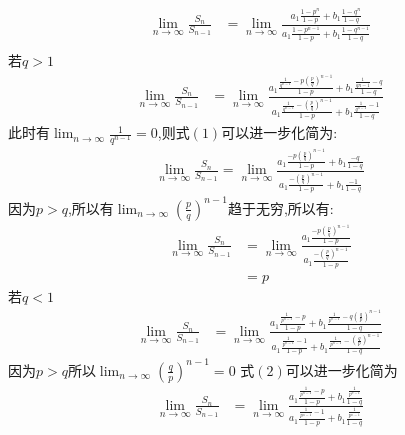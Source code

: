 \begin{questions}
	\begin{solution}
		\begin{align*}
			\lim_{n\to\infty}\frac{S_n}{S_{n-1}}
			 & = \lim_{n\to\infty}\frac{a_1\frac{1-p^n}{1-p}+b_1\frac{1-q^n}{1-q}}{a_1\frac{1-p^{n-1}}{1-p}+b_1\frac{1-q^{n-1}}{1-q}} \\
		\end{align*}
		若$q>1$
		\begin{align*}
			\lim_{n\to\infty}\frac{S_n}{S_{n-1}}
			 & =\lim_{n\to\infty}\frac{a_1\frac{\frac{1}{q^{n-1}}- p\left( \frac{p}{q} \right)^{n-1}}{1-p} +
				b_1\frac{\frac{1}{q{n-1}}-q}{1-q}}
			{a_1\frac{\frac{1}{q^{n-1}}- \left( \frac{p}{q} \right)^{n-1}}{1-p} + b_1\frac{\frac{1}{q^{n-1}}-1}{1-q}}
			\tag{1}
		\end{align*}
		此时有$\displaystyle\lim_{n\to\infty}\frac{1}{q^{n-1}}=0$,则式$(1)$可以进一步化简为:
		\begin{align*}
			\lim_{n\to\infty}\frac{S_n}{S_{n-1}} = \lim_{n\to\infty}\frac{a_1\frac{-p \left( \frac{p}{q}
					\right)^{n-1}}{1-p} + b_1\frac{-q}{1-q}}
			{a_1\frac{-\left( \frac{p}{q} \right)^{n-1}}{1-p} + b_1\frac{-1}{1-q}}
		\end{align*}
		因为$p>q$,所以有$\displaystyle\lim_{n\to\infty}\left( \frac{p}{q} \right)^{n-1}$趋于无穷,所以有:
		\begin{align*}
			\lim_{n\to\infty}\frac{S_n}{S_{n-1}} & = \lim_{n\to\infty}\frac{a_1\frac{-p \left( \frac{p}{q}
			\right)^{n-1}}{1-p}}{a_1\frac{-\left( \frac{p}{q}\right)^{n-1}}{1-p}}                          \\
			                                     & = p
		\end{align*}
		若$q<1$
		\begin{align*}
			\lim_{n\to\infty}\frac{S_n}{S_{n-1}}
			 & = \lim_{n\to\infty}\frac{a_1\frac{\frac{1}{p^{n-1}}-p}{1-p} + b_1\frac{\frac{1}{p^{n-1}}-q \left(
					\frac{q}{p} \right)^{n-1}}{1-q}}
			{a_1\frac{\frac{1}{p^{n-1}}-1}{1-p} + b_1\frac{\frac{1}{p^{n-1}}- \left( \frac{q}{p} \right)^{n-1}}{1-q}}
			\tag{2}
		\end{align*}
		因为$p> q$所以$\displaystyle\lim_{n\to\infty}\left(  \frac{q}{p}\right)^{n-1} = 0$
		式$(2)$可以进一步化简为
		\begin{align*}
			\lim_{n\to\infty}\frac{S_n}{S_{n-1}} & =
			\lim_{n\to\infty}\frac{a_1\frac{\frac{1}{p^{n-1}}-p}{1-p}+b_1\frac{\frac{1}{p^{n-1}}}{1-q}}
			{a_1\frac{\frac{1}{p^{n-1}}-1}{1-p} + b_1\frac{\frac{1}{p^{n-1}}}{1-q}} \tag{3}
		\end{align*}

\end{solution}
\end{questions}
